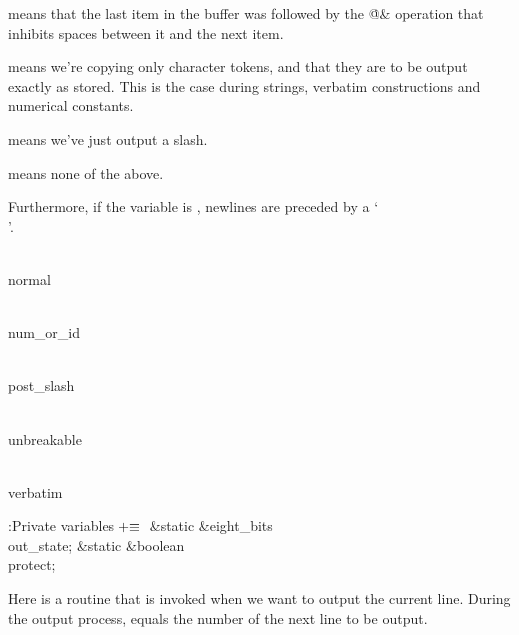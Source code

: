 \yskip\hang {} means that the last item in the buffer was
followed
by the \.{@\&} operation that inhibits spaces between it and the next item.

\yskip\hang {} means we're copying only character tokens, and
that they are to be output exactly as stored.  This is the case during
strings, verbatim constructions and numerical constants.

\yskip\hang {} means we've just output a slash.

\yskip\hang {} means none of the above.

\yskip\noindent Furthermore, if the variable  is ,
newlines
are preceded by a `\.\\'.

\Y\B\4\D\\{normal}\5
\par
\B\4\D\\{num\_or\_id}\5
\par
\B\4\D\\{post\_slash}\5
\par
\B\4\D\\{unbreakable}\5
\par
\B\4\D\\{verbatim}\5
\par
\Y\B\4:Private variables\X${}\mathrel+\equiv{}$\6
\&{static} \&{eight\_bits} \\{out\_state};\6
\&{static} \&{boolean} \\{protect};%
\par
\fi

Here is a routine that is invoked when we want to output the current
line.
During the output process,  equals the number of the next
line
to be output.

